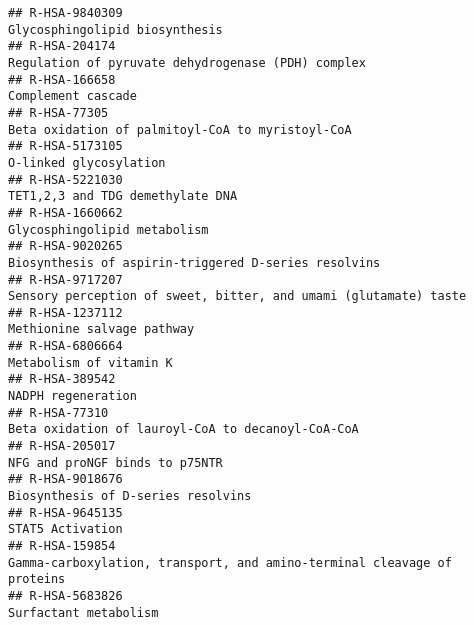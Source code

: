 \documentclass[
]{article}
\begin{document}
\begin{verbatim}
## R-HSA-9840309                                                                                                       Glycosphingolipid biosynthesis
## R-HSA-204174                                                                                    Regulation of pyruvate dehydrogenase (PDH) complex
## R-HSA-166658                                                                                                                    Complement cascade
## R-HSA-77305                                                                                       Beta oxidation of palmitoyl-CoA to myristoyl-CoA
## R-HSA-5173105                                                                                                               O-linked glycosylation
## R-HSA-5221030                                                                                                     TET1,2,3 and TDG demethylate DNA
## R-HSA-1660662                                                                                                         Glycosphingolipid metabolism
## R-HSA-9020265                                                                                 Biosynthesis of aspirin-triggered D-series resolvins
## R-HSA-9717207                                                                     Sensory perception of sweet, bitter, and umami (glutamate) taste
## R-HSA-1237112                                                                                                           Methionine salvage pathway
## R-HSA-6806664                                                                                                              Metabolism of vitamin K
## R-HSA-389542                                                                                                                    NADPH regeneration
## R-HSA-77310                                                                                      Beta oxidation of lauroyl-CoA to decanoyl-CoA-CoA
## R-HSA-205017                                                                                                        NFG and proNGF binds to p75NTR
## R-HSA-9018676                                                                                                   Biosynthesis of D-series resolvins
## R-HSA-9645135                                                                                                                     STAT5 Activation
## R-HSA-159854                                                               Gamma-carboxylation, transport, and amino-terminal cleavage of proteins
## R-HSA-5683826                                                                                                                Surfactant metabolism

\end{verbatim}
\end{document}
